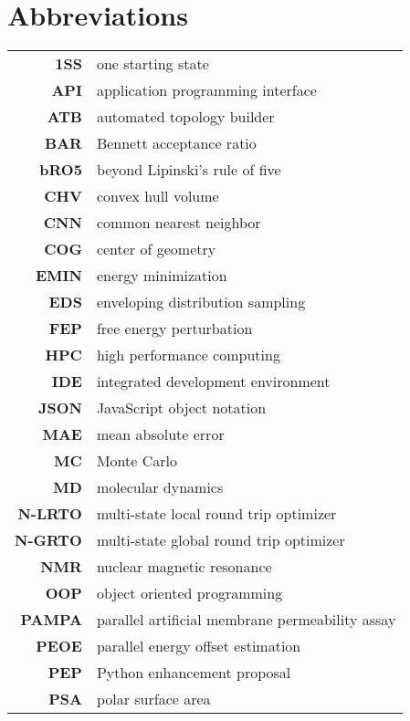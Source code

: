 \chapter{Abbreviations}
\begin{center}
\begin{longtable}{ >{\bfseries}r l}

 1SS & one starting state \\
 API & application programming interface\\
 ATB & automated topology builder \\

 BAR & Bennett acceptance ratio \\
 bRO5 & beyond Lipinski's rule of five \\

 CHV & convex hull volume\\
 CNN & common nearest neighbor\\
 COG & center of geometry\\
 
 EMIN & energy minimization\\
 EDS & enveloping distribution sampling \\
 FEP & free energy perturbation \\

 HPC & high performance computing \\
 IDE & integrated development environment\\

 JSON & JavaScript object notation\\

 MAE & mean absolute error\\
 MC  & Monte Carlo \\
 MD  & molecular dynamics\\ 
 N-LRTO & multi-state local round trip optimizer \\
 N-GRTO & multi-state global round trip optimizer \\
 NMR & nuclear magnetic resonance\\
 
 OOP & object oriented programming\\

 PAMPA & parallel artificial membrane permeability assay\\
 PEOE & parallel energy offset estimation\\
 PEP & Python enhancement proposal\\
 PSA & polar surface area\\


\end{longtable}
\end{center}
